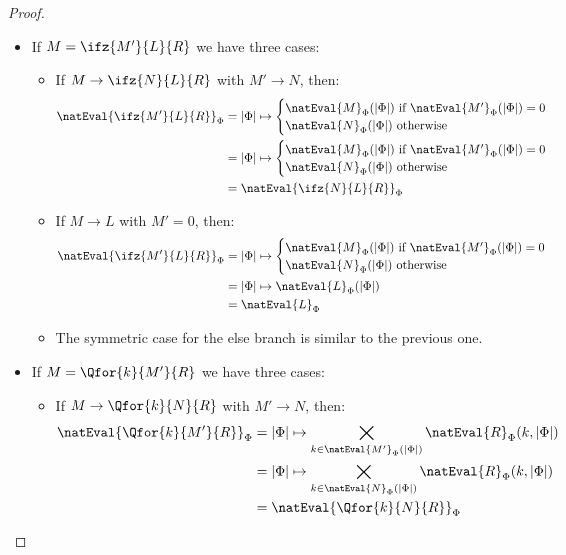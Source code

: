 \begin{proof}
\begin{itemize}
        \item If $M = \ifz{M'}{L}{R}$ we have three cases:
        \begin{itemize}
            \item If $M\to \ifz{N}{L}{R}$ with $M'\to N$, then: 
            \begin{align*}
                \natEval{\ifz{M'}{L}{R}}_\Phi &= |\Phi| \mapsto 
                    \begin{cases}
                    \natEval{M}_\Phi(|\Phi|) \text{ if } \natEval{M'}_\Phi(|\Phi|) = 0 \\
                    \natEval{N}_\Phi(|\Phi|) \text{ otherwise}
                    \end{cases}\\
                &= |\Phi| \mapsto 
                \begin{cases}
                \natEval{M}_\Phi(|\Phi|) \text{ if } \natEval{M'}_\Phi(|\Phi|) = 0 \\
                \natEval{N}_\Phi(|\Phi|) \text{ otherwise}
                \end{cases}\\
                &= \natEval{\ifz{N}{L}{R}}_\Phi
            \end{align*}

            \item If $M\to L$ with $M'= 0$, then: 
            \begin{align*}
                \natEval{\ifz{M'}{L}{R}}_\Phi &= |\Phi| \mapsto 
                \begin{cases}
                \natEval{M}_\Phi(|\Phi|) \text{ if } \natEval{M'}_\Phi(|\Phi|) = 0 \\
                \natEval{N}_\Phi(|\Phi|) \text{ otherwise}
                \end{cases}\\
            &= |\Phi| \mapsto \natEval{L}_\Phi(|\Phi|)\\
            &= \natEval{L}_\Phi
            \end{align*}

            \item The symmetric case for the else branch is similar to the previous one.
        \end{itemize}

        \item If $M = \Qfor{k}{M'}{R}$ we have three cases:
        \begin{itemize}
            \item If $M\to \Qfor{k}{N}{R}$ with $M'\to N$, then: 
            \begin{align*}
                \natEval{\Qfor{k}{M'}{R}}_\Phi &= |\Phi| \mapsto \bigtimes\limits_{k\in \natEval{M'}_\Phi(|\Phi|)} \natEval{R}_\Phi(k, |\Phi|)\\
                &= |\Phi| \mapsto \bigtimes\limits_{k\in \natEval{N}_\Phi(|\Phi|)} \natEval{R}_\Phi(k, |\Phi|)\\
                &= \natEval{\Qfor{k}{N}{R}}_\Phi
            \end{align*}


\end{itemize}
\end{itemize}
\end{proof}
